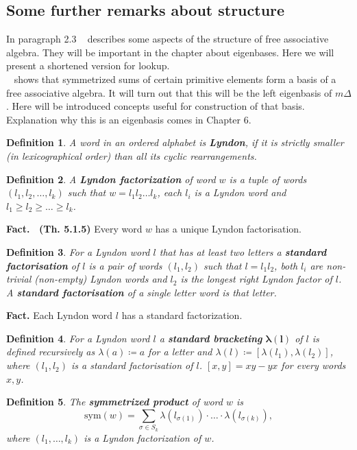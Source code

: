 \documentclass[a4paper, 12pt]{article}
\newtheorem{definition}{Definition}
\begin{document}
\subsection{Some further remarks about structure}
In paragraph 2.3 ~\cite{Diaconis2014} describes some aspects of the structure of free associative algebra.
They will be important in the chapter about eigenbases. Here we will present a shortened version for
 lookup.
 \\
~\cite{Garsia_auvancesin} shows that symmetrized sums of certain primitive elements form a basis of a free associative algebra.
It will turn out that this will be the left eigenbasis of $m\Delta$.
Here will be introduced concepts useful for
construction of that basis. Explanation why this is an eigenbasis comes in Chapter 6.
\begin{definition}
A word in an ordered alphabet is \textbf{Lyndon}, if it is strictly smaller (in lexicographical order)
 than all its cyclic rearrangements.
\end{definition}
\begin{definition}
A \textbf{Lyndon factorization} of word $w$ is a tuple of words $(l_1, l_2, \dots, l_k)$ such that
$w = l_1l_2\dots l_k$, each $l_i$ is a Lyndon word and $l_1 \geq l_2 \geq \dots \geq l_k$.
\end{definition}
\noindent\textbf{Fact. ~\cite{Lothaire}(Th. 5.1.5)} Every word $w$ has a unique Lyndon factorisation.
\begin{definition}
For a Lyndon word $l$ that has at least two letters a \textbf{standard factorisation} of $l$ is a pair of
words $(l_1, l_2)$ such that $l = l_1l_2$, both $l_i$ are non-trivial (non-empty) Lyndon words and $l_2$
is the longest right Lyndon factor of $l$. A \textbf{standard factorisation} of a single letter word is that
letter.
\end{definition}
\noindent\textbf{Fact.} Each Lyndon word $l$ has a standard factorization.
\begin{definition}
For a Lyndon word $l$ a \textbf{standard bracketing} $\boldsymbol{\lambda(l)}$ of $l$ is defined recursively
as
$\lambda(a) \coloneqq a$ for a letter and $\lambda(l) \coloneqq [\lambda(l_1), \lambda(l_2)]$, where $(l_1,
l_2)$
is a standard factorisation of $l$. $[x, y] = xy - yx$ for every words $x, y$.
\end{definition}
\begin{definition}
The \textbf{symmetrized product} of word $w$ is
\begin{equation*}
\mathrm{sym}(w) = \sum_{\sigma \in S_k} \lambda(l_{\sigma(1)})\cdot\ldots\cdot\lambda(l_{\sigma(k)}),
\end{equation*}
where $(l_1, \dots, l_k)$ is a Lyndon factorization of $w$.
\end{definition}
\end{document}

